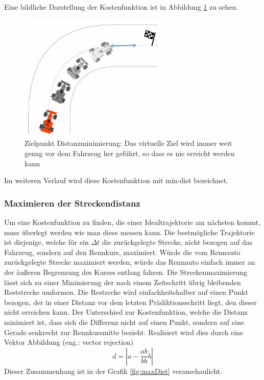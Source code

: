 \documentclass{like}
\begin{document}
Eine bildliche Darstellung der Kostenfunktion ist in Abbildung \ref{fig:costGoalDist} zu sehen. 

\begin{figure}[ht!]
	\centering
	\includegraphics[width=200pt]{Abbildungen/cost_goal_dist.png}
	\caption{Zielpunkt Distanzminimierung: Das virtuelle Ziel wird immer weit genug vor dem Fahrzeug her geführt, so dass es nie erreicht werden kann}
	\label{fig:costGoalDist}
\end{figure}
Im weiteren Verlauf wird diese Kostenfunktion mit min-dist bezeichnet.

\subsubsection*{Maximieren der Streckendistanz}
Um eine Kostenfunktion zu finden, die einer Idealtrajektorie am nächsten kommt, muss überlegt werden wie man diese messen kann. Die bestmögliche Trajektorie ist diejenige, welche für ein $\Delta t$ die zurückgelegte Strecke, nicht bezogen auf das Fahrzeug, sondern auf den Rennkurs, maximiert. Würde die vom Rennauto zurückgelegte Strecke maximiert werden, würde das Rennauto einfach immer an der äußeren Begrenzung des Kurses entlang fahren. Die Streckenmaximierung lässt sich zu einer Minimierung der nach einem Zeitschritt übrig bleibenden Reststrecke umformen. Die Restrecke wird einfachheitshalber auf einen Punkt bezogen, der in einer Distanz vor dem letzten Prädiktionsschritt liegt, den dieser nicht erreichen kann. Der Unterschied zur Kostenfunktion, welche die Distanz minimiert ist, dass sich die Differenz nicht auf einen Punkt, sondern auf eine Gerade senkrecht zur Rennkursmitte bezieht.
Realisiert wird dies durch eine Vektor Abbildung (eng.: vector rejection)
\begin{equation}
	d = |a - \frac{ab}{bb}b|
\end{equation}
Dieser Zusammenhang ist in der Grafik \ref{fig:maxDist} veranschaulicht.
\end{document}
